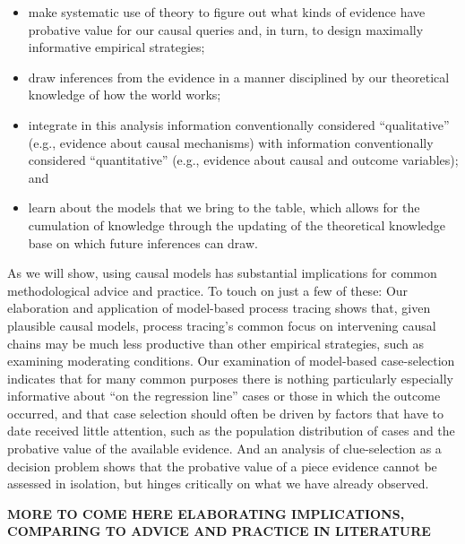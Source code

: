 \documentclass[12pt,]{book}
\begin{document}
\begin{itemize}
\item
  make systematic use of theory to figure out what kinds of evidence have probative value for our causal queries and, in turn, to design maximally informative empirical strategies;
\item
  draw inferences from the evidence in a manner disciplined by our theoretical knowledge of how the world works;
\item
  integrate in this analysis information conventionally considered ``qualitative'' (e.g., evidence about causal mechanisms) with information conventionally considered ``quantitative'' (e.g., evidence about causal and outcome variables); and
\item
  learn about the models that we bring to the table, which allows for the cumulation of knowledge through the updating of the theoretical knowledge base on which future inferences can draw.
\end{itemize}

As we will show, using causal models has substantial implications for common methodological advice and practice. To touch on just a few of these: Our elaboration and application of model-based process tracing shows that, given plausible causal models, process tracing's common focus on intervening causal chains may be much less productive than other empirical strategies, such as examining moderating conditions. Our examination of model-based case-selection indicates that for many common purposes there is nothing particularly especially informative about ``on the regression line'' cases or those in which the outcome occurred, and that case selection should often be driven by factors that have to date received little attention, such as the population distribution of cases and the probative value of the available evidence. And an analysis of clue-selection as a decision problem shows that the probative value of a piece evidence cannot be assessed in isolation, but hinges critically on what we have already observed.

\textbf{MORE TO COME HERE ELABORATING IMPLICATIONS, COMPARING TO ADVICE AND PRACTICE IN LITERATURE}
\end{document}
